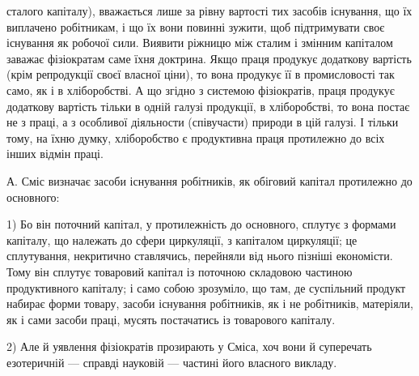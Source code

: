\parcont{}  %
сталого капіталу), вважається лише за рівну вартості тих засобів існування,
що їх виплачено робітникам, і що їх вони повинні зужити, щоб
підтримувати своє існування як робочої сили. Виявити ріжницю між сталим
і змінним капіталом заважає фізіократам саме їхня доктрина. Якщо
праця продукує додаткову вартість (крім репродукції своєї власної ціни),
то вона продукує її в промисловості так само, як і в хліборобстві. А
що згідно з системою фізіократів, праця продукує додаткову вартість
тільки в одній галузі продукції, в хліборобстві, то вона постає не з праці,
а з особливої діяльности (співучасти) природи в цій галузі. І тільки
тому, на їхню думку, хліборобство є продуктивна праця протилежно до
всіх інших відмін праці.

А. Сміс визначає засоби існування робітників, як обіговий капітал
протилежно до основного:

1) Бо він поточний капітал, у протилежність до основного, сплутує
з формами капіталу, що належать до сфери циркуляції, з капіталом
циркуляції; це сплутування, некритично ставлячись, перейняли від нього
пізніші економісти. Тому він сплутує товаровий капітал із поточною
складовою частиною продуктивного капіталу; і само собою зрозуміло,
що там, де суспільний продукт набирає форми товару, засоби існування
робітників, як і не робітників, матеріяли, як і сами засоби праці, мусять
постачатись із товарового капіталу.

2) Але й уявлення фізіократів прозирають у Сміса, хоч вони й суперечать
езотеричній — справді науковій — частині його власного викладу.

